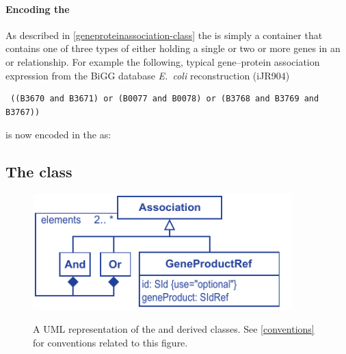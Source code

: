\paragraph{Encoding the \GeneProteinAssociation}
As described in \ref{geneproteinassociation-class} the \GeneProteinAssociation is simply a container that contains one of three types of \Association either holding a single \GeneProductRef or two or more genes in an \GeneAnd or \GeneOr relationship. For example the following, typical gene--protein association expression from the BiGG database \emph{E.~coli} reconstruction (iJR904) \cite{ijr904, bigg}
%
\begin{verbatim}
 ((B3670 and B3671) or (B0077 and B0078) or (B3768 and B3769 and B3767))
\end{verbatim}
%
is now encoded in the \FBCPackage as:
%
\subsection{The \FBC {} class}
\label{association-class}

%
\begin{figure}[h!]
  \centering
  \includegraphics[width=10cm]{images/v2harmony_fbc_association.pdf}\\
  \caption{A UML representation of the \FBCPackage \Association and derived 
	classes. See \ref{conventions} for conventions related to this figure.}
  \label{fig:fbc_uml_ass}
\end{figure}

